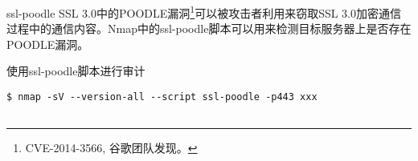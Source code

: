 \documentclass{beamer}
\begin{document}
\begin{frame}[fragile]{ssl-poodle}
SSL 3.0中的POODLE漏洞\footnote{CVE-2014-3566, 谷歌团队发现。}可以被攻击者利用来窃取SSL 3.0加密通信过程中的通信内容。Nmap中的ssl-poodle脚本可以用来检测目标服务器上是否存在POODLE漏洞。
\begin{block}{使用ssl-poodle脚本进行审计}
\begin{verbatim}
$ nmap -sV --version-all --script ssl-poodle -p443 xxx
 
\end{verbatim}
\end{block}
\end{frame}


\begin{frame}
\end{frame}
\end{document}
